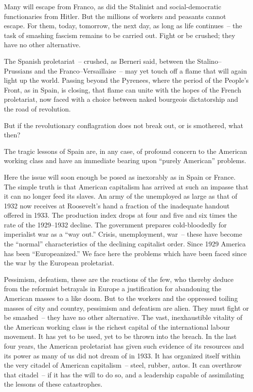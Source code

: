 Many will escape from Franco, as did the Stalinist and social-democratic functionaries from Hitler. But the millions of workers and peasants cannot escape. For them, today\kn, tomorrow\kn, the next day\kn, as long as life continues~-- the task of smashing fascism remains to be carried out. Fight or be crushed; they have no other alternative.

The Spanish proletariat~-- crushed, as Berneri said, between the Stalino--Prussians and the Franco--Versaillaise~-- may yet touch off a flame that will again light up the world. Passing beyond the Pyrenees, where the period of the People’s Front, as in Spain, is closing, that flame can unite with the hopes of the French proletariat, now faced with a choice between naked bourgeois dictatorship and the road of revolution.

But if the revolutionary conflagration does not break out, or is smothered, what then?

The tragic lessons of Spain are, in any case, of profound concern to the American working class and have an immediate bearing upon ``purely American'' problems.

Here the issue will soon enough be posed as inexorably as in Spain or France. The simple truth is that American capitalism has arrived at such an impasse that it can no longer feed its slaves. An army of the unemployed as large as that of 1932 now receives at Roosevelt’s hand a fraction of the inadequate handout offered in 1933. The production index drops at four and five and six times the rate of the 1929--1932 decline. The government prepares cold-bloodedly for imperialist war as a ``way out.\kn\kn'' Crisis, unemployment, war~-- these have become the ``normal'' characteristics of the declining capitalist order. Since 1929 America has been ``Europeanized.\kn\kn'' We face here the problems which have been faced since the war by the European proletariat.

Pessimism, defeatism, these are the reactions of the few\kn, who thereby deduce from the reformist betrayals in Europe a justification for abandoning the American masses to a like doom. But to the workers and the oppressed toiling masses of city and country, pessimism and defeatism are alien. They must fight or be smashed~-- they have no other alternative. The vast, inexhaustible vitality of the American working class is the richest capital of the international labour movement. It has yet to be used, yet to be thrown into the breach. In the last four years, the American proletariat has given such evidence of its resources and its power as many of us did not dream of in 1933. It has organized itself within the very citadel of American capitalism~-- steel, rubber\kn, autos. It can overthrow that citadel~-- if it has the will to do so, and a leadership capable of assimilating the lessons of these catastrophes.

